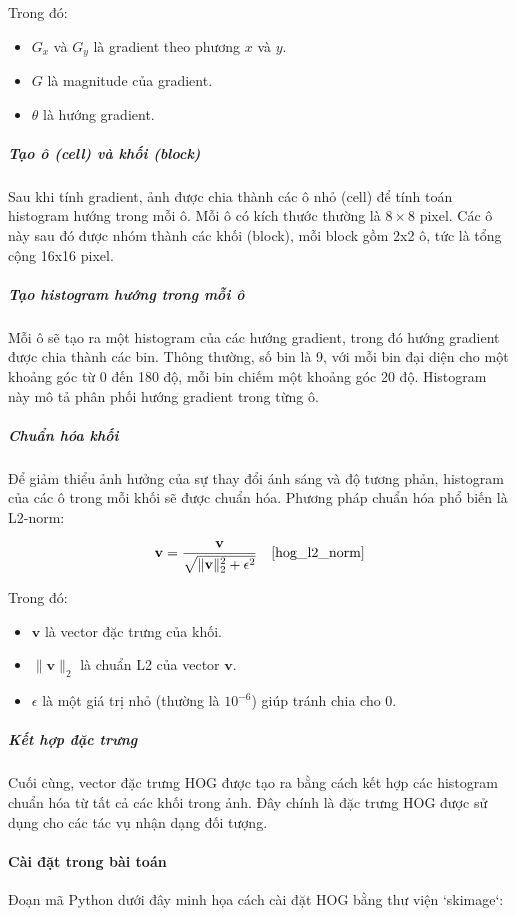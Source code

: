 \documentclass[a4paper,12pt]{article}
\begin{document}
\hspace{5mm}Trong đó:
\begin{itemize}
    \item \(G_x\) và \(G_y\) là gradient theo phương \(x\) và \(y\).
    \item \(G\) là magnitude của gradient.
    \item \(\theta\) là hướng gradient.
\end{itemize}

\subparagraph{Tạo ô (cell) và khối (block)}
\hspace{5mm}Sau khi tính gradient, ảnh được chia thành các ô nhỏ (cell) để tính toán histogram hướng trong mỗi ô. Mỗi ô có kích thước thường là \(8 \times 8\) pixel. Các ô này sau đó được nhóm thành các khối (block), mỗi block gồm 2x2 ô, tức là tổng cộng 16x16 pixel.

\subparagraph{Tạo histogram hướng trong mỗi ô}
\hspace{5mm}Mỗi ô sẽ tạo ra một histogram của các hướng gradient, trong đó hướng gradient được chia thành các bin. Thông thường, số bin là 9, với mỗi bin đại diện cho một khoảng góc từ 0 đến 180 độ, mỗi bin chiếm một khoảng góc 20 độ. Histogram này mô tả phân phối hướng gradient trong từng ô.

\subparagraph{Chuẩn hóa khối}
\hspace{5mm}Để giảm thiểu ảnh hưởng của sự thay đổi ánh sáng và độ tương phản, histogram của các ô trong mỗi khối sẽ được chuẩn hóa. Phương pháp chuẩn hóa phổ biến là L2-norm:

\[
\mathbf{v} = \frac{\mathbf{v}}{\sqrt{\|\mathbf{v}\|_2^2 + \epsilon^2}} \quad \text{\cite{hog_l2_norm}}
\]

Trong đó:
\begin{itemize}
    \item \(\mathbf{v}\) là vector đặc trưng của khối.
    \item \(\|\mathbf{v}\|_2\) là chuẩn L2 của vector \(\mathbf{v}\).
    \item \(\epsilon\) là một giá trị nhỏ (thường là \(10^{-6}\)) giúp tránh chia cho 0.
\end{itemize}

\subparagraph{Kết hợp đặc trưng}
\hspace{5mm}Cuối cùng, vector đặc trưng HOG được tạo ra bằng cách kết hợp các histogram chuẩn hóa từ tất cả các khối trong ảnh. Đây chính là đặc trưng HOG được sử dụng cho các tác vụ nhận dạng đối tượng.

\paragraph{Cài đặt trong bài toán}
\hspace{5mm}Đoạn mã Python dưới đây minh họa cách cài đặt HOG bằng thư viện `skimage`:
\end{document}

